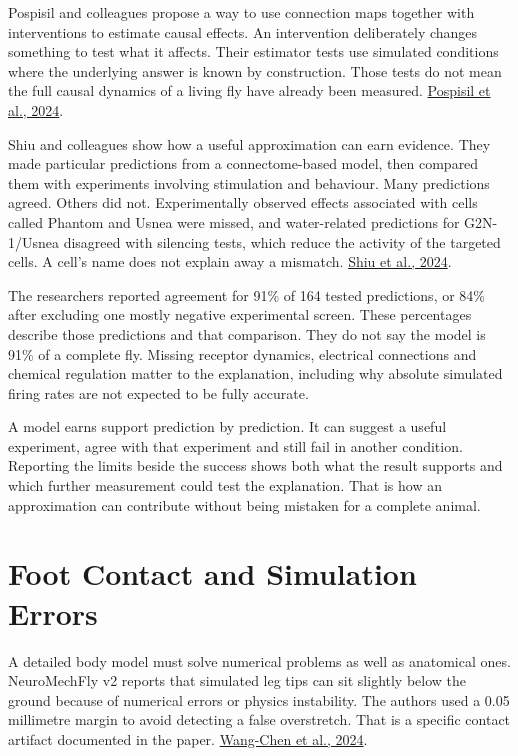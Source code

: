 Pospisil and colleagues propose a way to use connection maps together with interventions to estimate causal effects. An intervention deliberately changes something to test what it affects. Their estimator tests use simulated conditions where the underlying answer is known by construction. Those tests do not mean the full causal dynamics of a living fly have already been measured. \href{https://www.nature.com/articles/s41586-024-07982-0}{Pospisil et al., 2024}.\par

Shiu and colleagues show how a useful approximation can earn evidence. They made particular predictions from a connectome-based model, then compared them with experiments involving stimulation and behaviour. Many predictions agreed. Others did not. Experimentally observed effects associated with cells called Phantom and Usnea were missed, and water-related predictions for G2N-1/Usnea disagreed with silencing tests, which reduce the activity of the targeted cells. A cell's name does not explain away a mismatch. \href{https://pmc.ncbi.nlm.nih.gov/articles/PMC11446845/}{Shiu et al., 2024}.\par

The researchers reported agreement for 91\% of 164 tested predictions, or 84\% after excluding one mostly negative experimental screen. These percentages describe those predictions and that comparison. They do not say the model is 91\% of a complete fly. Missing receptor dynamics, electrical connections and chemical regulation matter to the explanation, including why absolute simulated firing rates are not expected to be fully accurate.\par

A model earns support prediction by prediction. It can suggest a useful experiment, agree with that experiment and still fail in another condition. Reporting the limits beside the success shows both what the result supports and which further measurement could test the explanation. That is how an approximation can contribute without being mistaken for a complete animal.\par

\section{Foot Contact and Simulation Errors}

A detailed body model must solve numerical problems as well as anatomical ones. NeuroMechFly v2 reports that simulated leg tips can sit slightly below the ground because of numerical errors or physics instability. The authors used a 0.05 millimetre margin to avoid detecting a false overstretch. That is a specific contact artifact documented in the paper. \href{https://gizemozd.github.io/assets/pdf/2024_neuromechflyv2.pdf}{Wang-Chen et al., 2024}.\par

